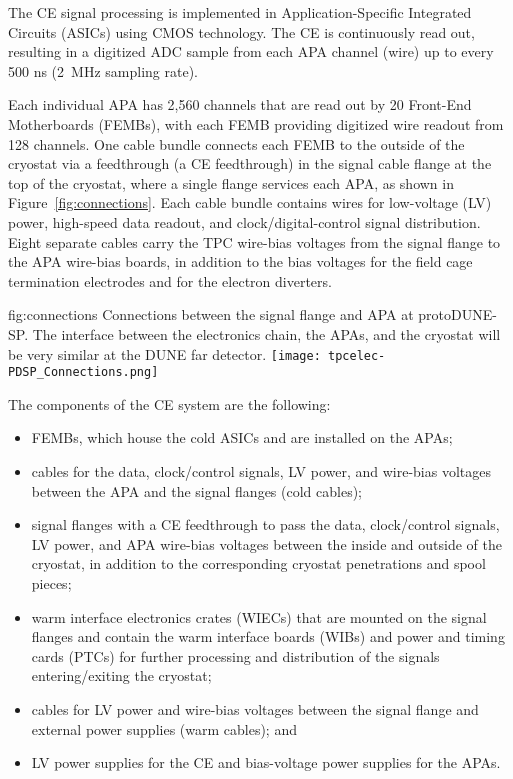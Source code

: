
The CE signal processing is implemented in Application-Specific Integrated Circuits (ASICs)
using CMOS technology.  The CE is continuously read out, resulting in a digitized ADC
sample from each APA channel (wire) up to every 500 ns (2~MHz sampling rate).

Each individual APA has 2,560 channels that are read out by 20 Front-End Motherboards (FEMBs), with
each FEMB providing digitized wire readout from 128 channels.  One cable bundle connects each FEMB to
the outside of the cryostat via a feedthrough (a CE feedthrough) in the signal cable flange at the
top of the cryostat, where a single flange services each APA, as shown in Figure~\ref{fig:connections}.
Each cable bundle contains wires for low-voltage (LV) power, high-speed data readout, and
clock/digital-control signal distribution.  Eight separate cables carry the TPC wire-bias voltages
from the signal flange to the APA wire-bias boards, in addition to the bias voltages for the field
cage termination electrodes and for the electron diverters.

\begin{dunefigure}
{fig:connections}
{Connections between the signal flange and APA at protoDUNE-SP.  The interface between the electronics chain, the APAs, and the cryostat will be very similar at the DUNE far detector.}
\texttt{[image: tpcelec-PDSP\_Connections.png]}
\end{dunefigure}

The components of the CE system are the following:
\begin{itemize}
\item{FEMBs, which house the cold ASICs and are installed on the
APAs;}
\item{cables for the data, clock/control signals, LV power, and wire-bias voltages between the APA and the signal flanges (cold cables);}
\item{signal flanges with a CE feedthrough to pass the data, clock/control signals, LV power, and APA wire-bias voltages between the inside and outside of the cryostat, in addition to the corresponding cryostat penetrations and spool pieces;}
\item{warm interface electronics crates (WIECs) that are mounted on the signal flanges and contain
the warm interface boards (WIBs) and power and timing cards (PTCs) for further processing
and distribution of the signals entering/exiting the cryostat;}
\item{cables for LV power and wire-bias voltages between the signal flange and external power
supplies (warm cables); and}
\item{LV power supplies for the CE and bias-voltage power supplies for the APAs.}
\end{itemize}

